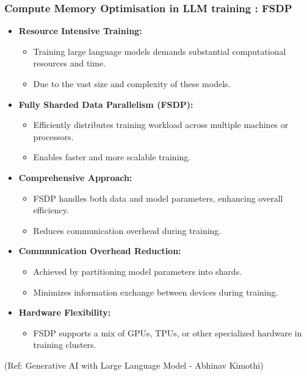 \begin{frame}[fragile]\frametitle{Compute Memory Optimisation in LLM training : FSDP}

\begin{itemize}
  \item \textbf{Resource Intensive Training:}
    \begin{itemize}
      \item Training large language models demands substantial computational resources and time.
      \item Due to the vast size and complexity of these models.
    \end{itemize}

  \item \textbf{Fully Sharded Data Parallelism (FSDP):}
    \begin{itemize}
      \item Efficiently distributes training workload across multiple machines or processors.
      \item Enables faster and more scalable training.
    \end{itemize}

  \item \textbf{Comprehensive Approach:}
    \begin{itemize}
      \item FSDP handles both data and model parameters, enhancing overall efficiency.
      \item Reduces communication overhead during training.
    \end{itemize}

  \item \textbf{Communication Overhead Reduction:}
    \begin{itemize}
      \item Achieved by partitioning model parameters into shards.
      \item Minimizes information exchange between devices during training.
    \end{itemize}

  \item \textbf{Hardware Flexibility:}
    \begin{itemize}
      \item FSDP supports a mix of GPUs, TPUs, or other specialized hardware in training clusters.
    \end{itemize}
\end{itemize}

{\tiny (Ref: Generative AI with Large Language Model - Abhinav  Kimothi)}

\end{frame}


